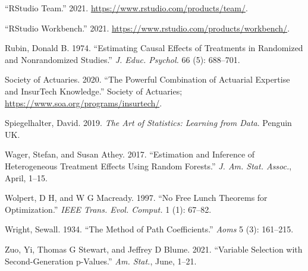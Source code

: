 \documentclass{article}
\newlength{\cslhangindent}
\newlength{\cslentryspacingunit} %
\newenvironment{CSLReferences}[2] %
 {%
  \setlength{\parindent}{0pt}
  \ifodd #1
  \let\oldpar\par
  \def\par{\hangindent=\cslhangindent\oldpar}
  \fi
  \setlength{\parskip}{#2\cslentryspacingunit}
 }%
 {}
\begin{document}
\begin{CSLReferences}{1}{0}
\leavevmode{}%
{``{RStudio} Team.''} 2021.
\url{https://www.rstudio.com/products/team/}.

\leavevmode{}%
{``{RStudio} Workbench.''} 2021.
\url{https://www.rstudio.com/products/workbench/}.

\leavevmode{}%
Rubin, Donald B. 1974. {``Estimating Causal Effects of Treatments in
Randomized and Nonrandomized Studies.''} \emph{J. Educ. Psychol.} 66
(5): 688--701.

\leavevmode{}%
Society of Actuaries. 2020. {``The Powerful Combination of Actuarial
Expertise and {InsurTech} Knowledge.''} Society of Actuaries;
\url{https://www.soa.org/programs/insurtech/}.

\leavevmode{}%
Spiegelhalter, David. 2019. \emph{The Art of Statistics: Learning from
Data}. Penguin UK.

\leavevmode{}%
Wager, Stefan, and Susan Athey. 2017. {``Estimation and Inference of
Heterogeneous Treatment Effects Using Random Forests.''} \emph{J. Am.
Stat. Assoc.}, April, 1--15.

\leavevmode{}%
Wolpert, D H, and W G Macready. 1997. {``No Free Lunch Theorems for
Optimization.''} \emph{IEEE Trans. Evol. Comput.} 1 (1): 67--82.

\leavevmode{}%
Wright, Sewall. 1934. {``The Method of Path Coefficients.''} \emph{Aoms}
5 (3): 161--215.

\leavevmode{}%
Zuo, Yi, Thomas G Stewart, and Jeffrey D Blume. 2021. {``Variable
Selection with Second-Generation p-Values.''} \emph{Am. Stat.}, June,
1--21.

\end{CSLReferences}



\end{document}
